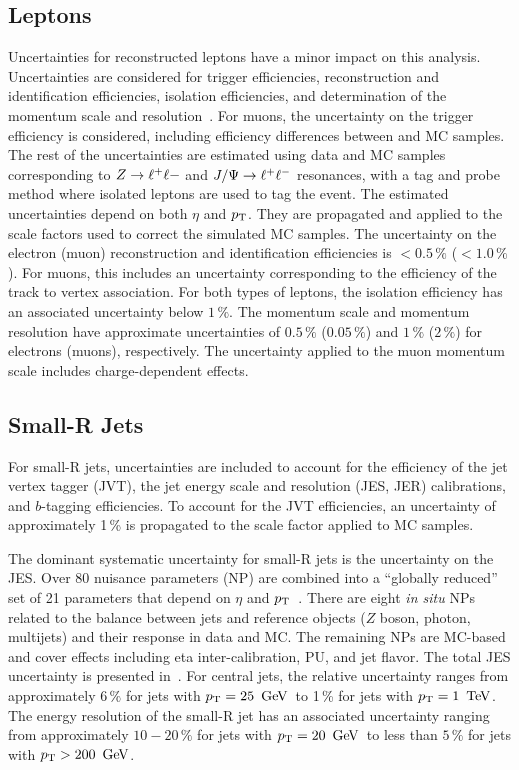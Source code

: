 \subsection{Leptons}
Uncertainties for reconstructed leptons have a minor impact on this analysis. Uncertainties are considered for trigger efficiencies, reconstruction and identification efficiencies, isolation efficiencies, and determination of the momentum scale and resolution~\cite{electron_efficiency_2016, muon_eff}. For muons, the uncertainty on the \MET trigger efficiency is considered, including efficiency differences between \ttbar and \Wjets MC samples. The rest of the uncertainties are estimated using data and MC samples corresponding to $Z\rightarrow \ell^+\ell-$ and $J/\Psi\rightarrow\ell^+\ell^-$ resonances, with a tag and probe method where isolated leptons are used to tag the event. The estimated uncertainties depend on both $\eta$ and $p_{\text{T}}$. They are propagated and applied to the scale factors used to correct the simulated MC samples. The uncertainty on the electron (muon) reconstruction and identification efficiencies is $<0.5\,\%$ ($<1.0\,\%$). For muons, this includes an uncertainty corresponding to the efficiency of the track to vertex association. For both types of leptons, the isolation efficiency has an associated uncertainty below $1\,\%$. The momentum scale and momentum resolution have approximate uncertainties of $0.5\,\%$ ($0.05\,\%$) and $1\,\%$ ($2\,\%$) for electrons (muons), respectively. The uncertainty applied to the muon momentum scale includes charge-dependent effects.  

%
\subsection{Small-R Jets}

For small-R jets, uncertainties are included to account for the efficiency of the jet vertex tagger (JVT), the jet energy scale and resolution (JES, JER) calibrations, and $b$-tagging efficiencies. To account for the JVT efficiencies, an uncertainty of approximately 1\,\% is propagated to the scale factor applied to MC samples. 

The dominant systematic uncertainty for small-R jets is the uncertainty on the JES. Over 80 nuisance parameters (NP) are combined into a ``globally reduced'' set of 21 parameters that depend on $\eta$ and $p_{\text{T}}$~\cite{jes_unc}. There are eight {\em in situ} NPs related to the \pT balance between jets and reference objects ($Z$ boson, photon, multijets) and their response in data and MC. The remaining NPs are MC-based and cover effects including eta inter-calibration, PU, and jet flavor. The total JES uncertainty is presented in~\Fig{\ref{fig:jes_unc}}. For central jets, the relative uncertainty ranges from approximately $6\,\%$ for jets with $\pT=25\,\GeV$\, to 1\,\% for jets with $\pt=1\,\TeV$. The energy resolution of the small-R jet has an associated uncertainty ranging from approximately $10-20\,\%$ for jets with $\pT=20\,\GeV$\, to less than $5\,\%$ for jets with $\pT>200\,\GeV$. 

